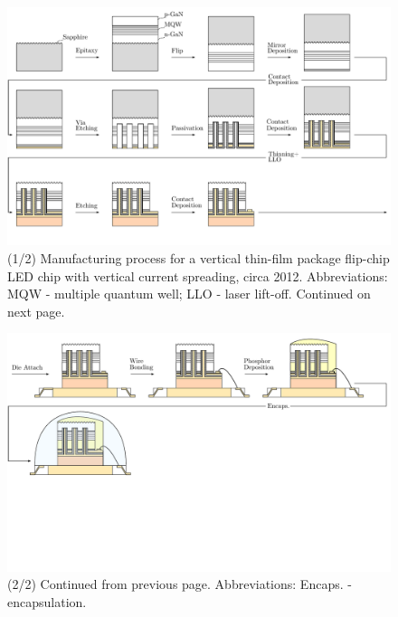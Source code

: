 \documentclass[10pt]{article}
\begin{document}
    \begin{landscape}
        \begin{figure}
            \includegraphics[width=595pt]{./figures/vtf_overview_2012-1.pdf}
            \caption{(1/2) Manufacturing process for a vertical thin-film  package flip-chip LED chip with vertical current spreading, circa 2012. Abbreviations: MQW - multiple quantum well; LLO - laser lift-off. Continued on next page.}
            \label{fig:manuf_vtf_2012-1}
        \end{figure}
    \end{landscape}

    \begin{landscape}
        \begin{figure}
            \includegraphics[width=595pt]{./figures/vtf_overview_2012-2.pdf}
            \caption{(2/2) Continued from previous page. Abbreviations: Encaps. - encapsulation.}
            \label{fig:manuf_vtf_2012-2}
        \end{figure}
    \end{landscape}
\end{document}
